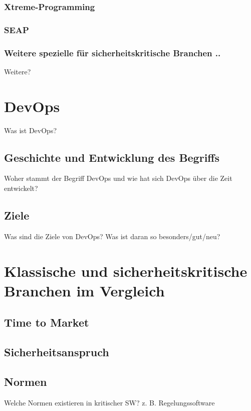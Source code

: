 \subsubsection{Xtreme-Programming}

\subsubsection{SEAP}

\subsubsection{Weitere spezielle für sicherheitskritische Branchen ..}
Weitere?

\section{DevOps} %
Was ist DevOps?

\subsection{Geschichte und Entwicklung des Begriffs}
Woher stammt der Begriff DevOps und wie hat sich DevOps über die Zeit entwickelt?

\subsection{Ziele}
Was sind die Ziele von DevOps? Was ist daran so besonders/gut/neu?

\section{Klassische und sicherheitskritische Branchen im Vergleich} %

\subsection{Time to Market}

\subsection{Sicherheitsanspruch}

\subsection{Normen}

Welche Normen existieren in kritischer SW? z. B. Regelungssoftware

